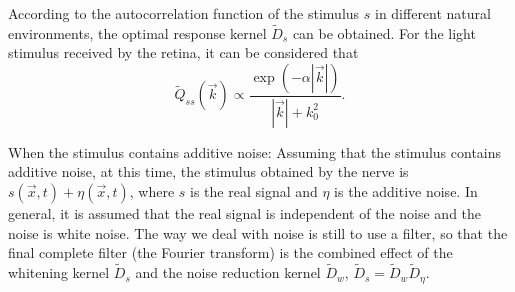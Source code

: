 According to the autocorrelation function of the stimulus $s$ in
different natural environments, the optimal response kernel
$\tilde{D}_s$ can be obtained. For the light stimulus received by
the retina, it can be considered that
\begin{equation}
  \tilde{Q}_{ss} (\vec{k })  \varpropto
\frac{\exp\left(-\alpha |\vec{k }
    |   \right) }{|\vec{k }
  |  +k _0^2 }.
\end{equation}

When the stimulus contains additive noise:
Assuming that the stimulus contains additive noise, at this time, the
stimulus obtained by the nerve is $s(\vec{x},t)+\eta(\vec{x},t)$,
where $s$ is the real signal and $\eta$ is the additive noise. In
general, it is assumed that the real signal is independent of the
noise and the noise is white noise. The way we deal with noise is
still to use a filter, so that the final complete filter (the Fourier
transform) is the combined effect of the whitening kernel
$\tilde{D}_s$ and the noise reduction kernel
$\tilde{D}_w$, $\tilde{D}_s=\tilde{D}_w\tilde{D}_\eta$.\\

